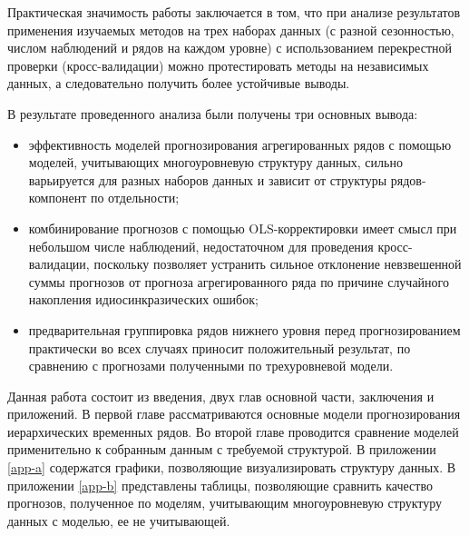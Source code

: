\documentclass[12pt,a4paper, oneside]{extreport}
\begin{document}

Практическая значимость работы заключается в том, что при анализе результатов применения изучаемых методов на трех наборах данных (с разной сезонностью, числом наблюдений и рядов на каждом уровне)   с использованием перекрестной проверки (кросс-валидации) можно протестировать методы на независимых данных, а следовательно получить более устойчивые  выводы. 



В результате проведенного анализа были получены три основных вывода: 

\begin{itemize}
	\item эффективность  моделей прогнозирования  агрегированных рядов с помощью моделей, учитывающих многоуровневую структуру данных,  сильно варьируется для разных наборов данных и зависит от структуры рядов-компонент   по отдельности;
\item комбинирование прогнозов с помощью OLS-корректировки  имеет смысл при небольшом числе наблюдений, недостаточном для проведения кросс-валидации, поскольку позволяет устранить сильное отклонение невзвешенной суммы прогнозов от прогноза агрегированного ряда по причине случайного накопления идиосинкразических ошибок;
\item     предварительная группировка рядов нижнего уровня перед прогнозированием практически во всех случаях приносит положительный результат, по сравнению с прогнозами полученными по трехуровневой модели. 
\end{itemize}



Данная работа состоит из введения, двух глав основной части, заключения и приложений. В первой главе рассматриваются основные модели прогнозирования иерархических временных рядов.  Во второй главе проводится  сравнение моделей применительно к собранным данным с требуемой структурой. 
В приложении \ref{app-a} содержатся графики, позволяющие визуализировать структуру данных. В приложении \ref{app-b} представлены таблицы, позволяющие сравнить качество прогнозов, полученное по  моделям, учитывающим многоуровневую  структуру данных с моделью, ее не учитывающей. 







\end{document}
